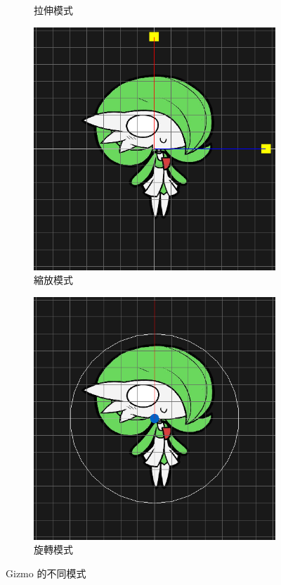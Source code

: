\begin{figure}[h]
\begin{center}
\begin{subfigure}[h]{0.24\linewidth}
        \caption{拉伸模式}
    \end{subfigure}
    \begin{subfigure}[h]{0.24\linewidth}
        \includegraphics[width=\linewidth]{./resources/editor/gizmo_c.png}
        \caption{縮放模式}
    \end{subfigure}
    \begin{subfigure}[h]{0.24\linewidth}
        \includegraphics[width=\linewidth]{./resources/editor/gizmo_d.png}
        \caption{旋轉模式}
    \end{subfigure}
    \end{center}
\caption{Gizmo 的不同模式}
\label{fig:Gizmo}
\end{figure}

